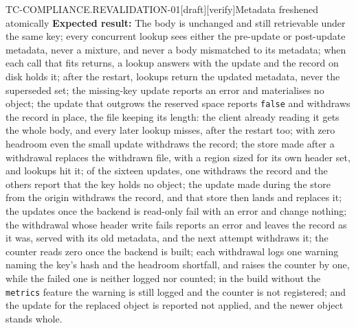 \begin{requirement}{TC-COMPLIANCE.REVALIDATION-01}[draft][verify]{Metadata freshened atomically}
  \textbf{Expected result:} The body is unchanged and still retrievable under the
  same key; every concurrent lookup sees either the pre-update or post-update
  metadata, never a mixture, and never a body mismatched to its metadata;
  when each call that fits returns, a lookup answers with the update and the
  record on disk holds it; after the restart, lookups return the updated
  metadata, never the superseded set; the missing-key update reports an
  error and materialises no object; the update that outgrows the reserved
  space reports \texttt{false} and withdraws the record in place, the file
  keeping its length: the client already reading it gets the whole body, and
  every later lookup misses, after the restart too; with zero headroom even
  the small update withdraws the record; the store made after a withdrawal
  replaces the withdrawn file, with a region sized for its own header set,
  and lookups hit it; of the sixteen updates, one withdraws the record and
  the others report that the key holds no object; the update made during
  the store from the origin withdraws the record, and that store then lands
  and replaces it; the updates once the backend is read-only fail with an
  error and change nothing; the withdrawal whose header write fails reports
  an error and leaves the record as it was, served with its old metadata,
  and the next attempt withdraws it; the counter reads zero once the
  backend is built; each withdrawal logs one warning naming
  the key's hash and the headroom shortfall, and raises the counter by one,
  while the failed one is neither logged nor counted; in the build without
  the \texttt{metrics} feature the warning is still logged and the counter
  is not registered; and the update for the replaced object is reported not
  applied, and the newer object stands whole.



\end{requirement}

